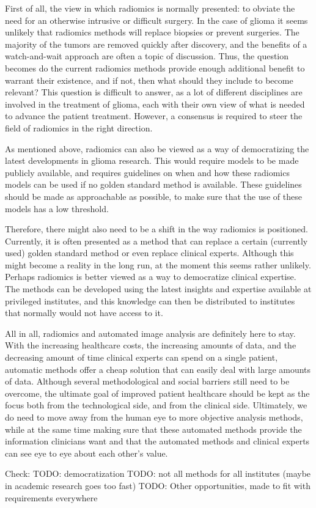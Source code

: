 First of all, the view in which radiomics is normally presented: to obviate the need for an otherwise intrusive or difficult surgery.
In the case of glioma it seems unlikely that radiomics methods will replace biopsies or prevent surgeries.
The majority of the \glspl{tumor} are removed quickly after discovery, and the benefits of a watch-and-wait approach are often a topic of discussion.
Thus, the question becomes do the current radiomics methods provide enough additional benefit to warrant their existence, and if not, then what should they include to become relevant?
This question is difficult to answer, as a lot of different disciplines are involved in the treatment of glioma, each with their own view of what is needed to advance the patient treatment.
However, a consensus is required to steer the field of radiomics in the right direction.

As mentioned above, radiomics can also be viewed as a way of democratizing the latest  developments in glioma research.
This would require models to be made publicly available, and requires guidelines on when and how these radiomics models can be used if no golden standard method is available.
These guidelines should be made as approachable as possible, to make sure that the use of these models has a low threshold.


Therefore, there might also need to be a shift in the way radiomics is positioned.
Currently, it is often presented as a method that can replace a certain (currently used) golden standard method or even replace clinical experts.
Although this might become a reality in the long run, at the moment this seems rather unlikely.
Perhaps radiomics is better viewed as a way to democratize clinical expertise.
The methods can be developed using the latest insights and expertise available at privileged institutes, and this knowledge can then be distributed to institutes that normally would not have access to it.

All in all, radiomics and automated image analysis are definitely here to stay.
With the increasing healthcare costs, the increasing amounts of data, and the decreasing amount of time clinical experts can spend on a single patient, automatic methods offer a cheap solution that can easily deal with large amounts of data.
Although several methodological and social barriers still need to be overcome, the ultimate goal of improved patient healthcare should be kept as the focus both from the technological side, and from the clinical side.
Ultimately, we do need to move away from the human eye to more objective analysis methods, while at the same time making sure that these automated methods provide the information clinicians want and that the automated methods and clinical experts can see eye to eye about each other's value.

Check:
TODO: democratization
TODO: not all methods for all institutes (maybe in academic research goes too fast)
TODO: Other opportunities, made to fit with requirements everywhere
